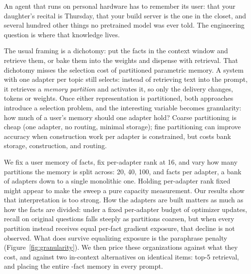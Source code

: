\documentclass{article}
\begin{document}
An agent that runs on personal hardware has to remember its user: that your
daughter's recital is Thursday, that your build server is the one in the closet,
and several hundred other things no pretrained model was ever told. The
engineering question is where that knowledge lives.

The usual framing is a dichotomy: put the facts in the context window and
retrieve them, or bake them into the weights and dispense with retrieval. That
dichotomy misses the selection cost of partitioned parametric memory. A system
with one adapter per topic still selects: instead of retrieving text into the
prompt, it retrieves a \emph{memory partition} and activates it, so only the
delivery changes, tokens or weights. Once either representation is partitioned,
both approaches introduce a selection problem, and the interesting variable
becomes granularity: how much of a user's memory should one adapter hold? Coarse partitioning is cheap (one adapter, no routing, minimal
storage); fine partitioning can improve accuracy when construction work per
adapter is constrained, but costs bank storage, construction, and routing.

We fix a user memory of \NPerArm{} facts, fix per-adapter rank at 16, and vary how
many partitions the memory is split across: 20, 40, 100, and \NPerArm{} facts per
adapter, a bank of \GTwentyNad{} adapters down to a single monolithic one. Holding
per-adapter rank fixed might appear to make the sweep a pure capacity
measurement. Our results show that interpretation is too strong. How the adapters
are built matters as much as how the facts are divided: under a fixed per-adapter
budget of optimizer updates, recall on original questions falls steeply as
partitions coarsen, but when every partition instead receives equal per-fact
gradient exposure, that decline is not observed. What does survive equalizing
exposure is the paraphrase penalty (Figure~\ref{fig:granularity}). We then price
these organizations against what they cost, and against two in-context
alternatives on identical items: top-5 retrieval, and placing the entire
\NPerArm{}-fact memory in every prompt.
\end{document}
